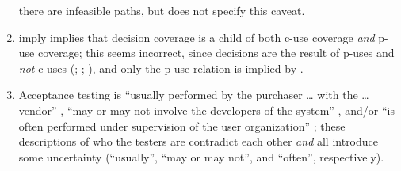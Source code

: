 \begin{enumerate}
          there are infeasible paths, but \citet[p.~5\=/13]{SWEBOK2025} does
          not specify this caveat.
    \item %
          \citet[Fig.~12.31]{PetersAndPedrycz2000} \ifnotpaper imply
          \else implies \fi that decision coverage is a child of both \acs{c-use}
          coverage \emph{and} \acs{p-use} coverage; this seems incorrect, since
          decisions are the result of \acsp{p-use} and \emph{not} \acsp{c-use}
          (\citealp[pp.~5, 27]{IEEE2021c}; \citeyear[p.~332]{IEEE2017};
          \citealp[p.~424]{vanVliet2000}), and only the \acs{p-use} relation is
          implied by \citet[Fig.~F.1]{IEEE2021c}.
    \item %
          Acceptance testing is ``usually performed by the purchaser \dots{}
          with the \dots{} vendor'' \citep[p.~5]{IEEE2017}, ``may or may not
          involve the developers of the system'' \citep[p.~4\=/6]{SWEBOK2014},
          and/or ``is often performed under supervision of the user
          organization'' \citep[p.~439]{vanVliet2000}; these descriptions
          of who the testers are contradict each other \emph{and} all introduce
          some uncertainty
          (``usually'', ``may or may not'', and ``often'', respectively).


\end{enumerate}
